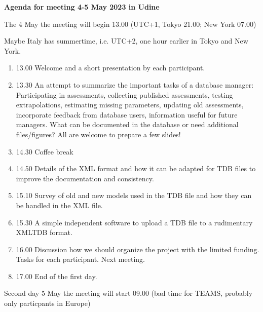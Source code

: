 \documentclass[12pt]{article}
\begin{document}
{\Large \bf Agenda for meeting 4-5 May 2023 in Udine}

\bigskip

The 4 May the meeting will begin 13.00 (UTC+1, Tokyo 21.00; New York 07.00)

Maybe Italy has summertime, i.e. UTC+2, one hour earlier in Tokyo and New York.



\begin{enumerate}
\item 13.00 Welcome and a short presentation by each participant.

\item 13.30 An attempt to summarize the important tasks of a database
  manager: Participating in assessments, collecting published
  assessments, testing extrapolations, estimating missing parameters,
  updating old assessments, incorporate feedback from database users,
  information useful for future managers.  What can be documented in
  the database or need additional files/figures?  All are welcome to
  prepare a few slides!

\item 14.30 Coffee break
  
\item 14.50 Details of the XML format and how it can be adapted for
  TDB files to improve the documentation and consistency.

\item 15.10 Survey of old and new models used in the TDB file and how
  they can be handled in the XML file.

\item 15.30 A simple independent software to upload a TDB file to a
  rudimentary XMLTDB format.

\item 16.00 Discussion how we should organize the project with the
  limited funding.  Tasks for each participant. Next meeting.

\item 17.00 End of the first day.
\end{enumerate}

Second day 5 May the meeting will start 09.00 (bad time for TEAMS,
probably only particpants in Europe)
\end{document}
